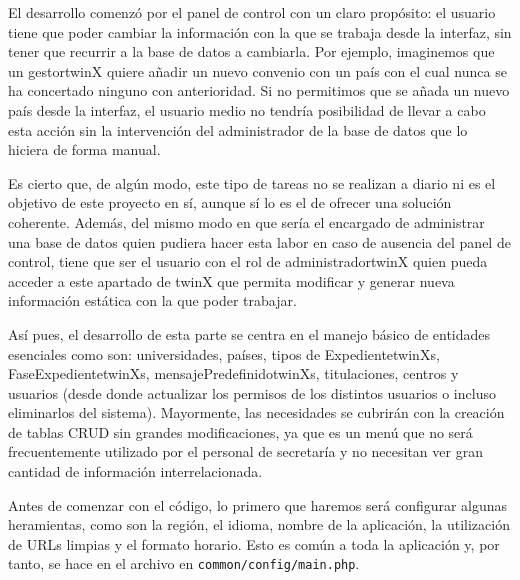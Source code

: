 El desarrollo comenzó por el panel de control con un claro propósito: el usuario tiene que poder cambiar la información con la que se trabaja desde la interfaz, sin tener que recurrir a la base de datos a cambiarla. Por ejemplo, imaginemos que un \gls{gestortwinX} quiere añadir un nuevo convenio con un país con el cual nunca se ha concertado ninguno con anterioridad. Si no permitimos que se añada un nuevo país desde la interfaz, el usuario medio no tendría posibilidad de llevar a cabo esta acción sin la intervención del administrador de la base de datos que lo hiciera de forma manual.

Es cierto que, de algún modo, este tipo de tareas no se realizan a diario ni es el objetivo de este proyecto en sí, aunque sí lo es el de ofrecer una solución coherente. Además, del mismo modo en que sería el encargado de administrar una base de datos quien pudiera hacer esta labor en caso de ausencia del panel de control, tiene que ser el usuario con el rol de \gls{administradortwinX} quien pueda acceder a este apartado de twinX que permita modificar y generar nueva información estática con la que poder trabajar.

Así pues, el desarrollo de esta parte se centra en el manejo básico de entidades esenciales como son: universidades, países, tipos de \glspl{ExpedientetwinX}, \glspl{FaseExpedientetwinX}, \glspl{mensajePredefinidotwinX}, titulaciones, centros y usuarios (desde donde actualizar los permisos de los distintos usuarios o incluso eliminarlos del sistema). Mayormente, las necesidades se cubrirán con la creación de tablas CRUD sin grandes modificaciones, ya que es un menú que no será frecuentemente utilizado por el personal de secretaría y no necesitan ver gran cantidad de información interrelacionada.

Antes de comenzar con el código, lo primero que haremos será configurar algunas heramientas, como son la región, el idioma, nombre de la aplicación, la utilización de URLs limpias y el formato horario. Esto es común a toda la aplicación y, por tanto, se hace en el archivo en \texttt{common/config/main.php}.

